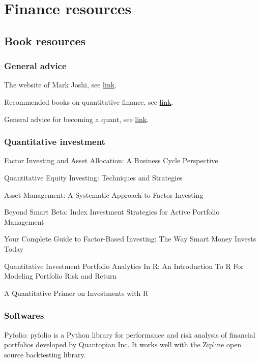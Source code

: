 \begin{refsection}
\begin{definition}
\end{definition}



\section{Finance resources}

\subsection{Book resources}

\subsubsection{General advice}

The website of Mark Joshi, see \href{http://www.markjoshi.com/}{link}.


Recommended books on quantitative finance, see \href{http://www.markjoshi.com/RecommendedBooks.html}{link}.


General advice for becoming a quant, see \href{http://www.markjoshi.com/downloads/advice.pdf}{link}.


\subsubsection{Quantitative investment}
Factor Investing and Asset Allocation: A Business Cycle Perspective

Quantitative Equity Investing: Techniques and Strategies

Asset Management: A Systematic Approach to Factor Investing

Beyond Smart Beta: Index Investment Strategies for Active Portfolio
Management

Your Complete Guide to Factor-Based Investing: The Way Smart
Money Invests Today

Quantitative Investment Portfolio Analytics In R: An Introduction To R
For Modeling Portfolio Risk and Return

A Quantitative Primer on Investments with R

\subsubsection{Softwares}

Pyfolio: pyfolio is a Python library for performance and risk analysis of financial portfolios developed by Quantopian Inc. It works well with the Zipline open source backtesting library.


\end{refsection}
